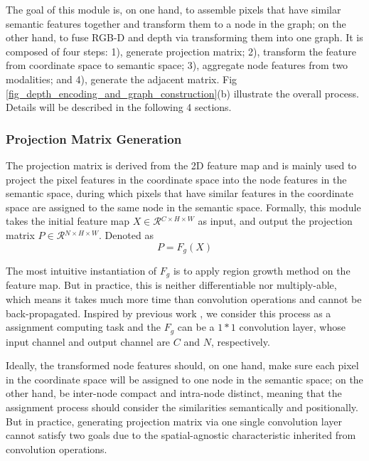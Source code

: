 ﻿\documentclass[journal]{IEEEtran}
\begin{document}
    The goal of this module is, on one hand, to assemble pixels that have similar semantic features together and transform them to a node in the graph; on the other hand, to fuse RGB-D and depth via transforming them into one graph. It is composed of four steps: 1), generate projection matrix; 2), transform the feature from coordinate space to semantic space; 3), aggregate node features from two modalities; and 4), generate the adjacent matrix. Fig \ref{fig_depth_encoding_and_graph_construction}(b) illustrate the overall process. Details will be described in the following 4 sections. 


\subsubsection{Projection Matrix Generation}\label{sec_generate_proj_matrix}
   
    The projection matrix is derived from the 2D feature map and is mainly used to project the pixel features in the coordinate space into the node features in the semantic space, during which pixels that have similar features in the coordinate space are assigned to the same node in the semantic space. Formally, this module takes the initial feature map ${X}\in\mathcal{R}{^{C\times H\times W}}$ as input, and output the projection matrix ${P}\in\mathcal{R}{^{N\times H \times W}}$. Denoted as 
    \begin{equation}\label{eq_gen_proj}
    P = F_g(X)
    \end{equation}

   
    The most intuitive instantiation of $F_g$ is to apply region growth method on the feature map. But in practice, this is neither differentiable nor multiply-able, which means it takes much more time than convolution operations and cannot be back-propagated. Inspired by previous work \cite{chen2019glore}, we consider this process as a assignment computing task and the $F_g$ can be a $1*1$ convolution layer, whose input channel and output channel are $C$ and $N$, respectively. 

 
    Ideally, the transformed node features should, on one hand, make sure each pixel in the coordinate space will be assigned to one node in the semantic space; on the other hand, be inter-node compact and intra-node distinct, meaning that the assignment process should consider the similarities semantically and positionally. But in practice, generating projection matrix via one single convolution layer cannot satisfy two goals due to the spatial-agnostic characteristic inherited from convolution operations.
    
\end{document}
